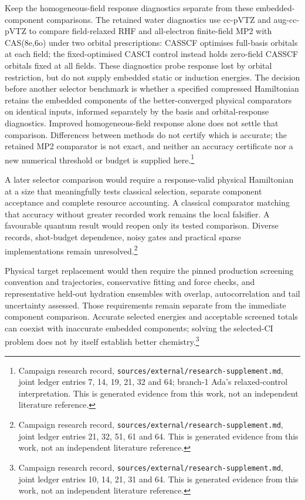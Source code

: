 \documentclass{article}
\newcommand{\record}[1]{\footnote{Campaign research record, \texttt{sources/external/research-supplement.md}, #1. This is generated evidence from this work, not an independent literature reference.}}
\begin{document}
Keep the homogeneous-field response diagnostics separate from these embedded-component comparisons. The retained water diagnostics use cc-pVTZ and aug-cc-pVTZ to compare field-relaxed RHF and all-electron finite-field MP2 with CAS(8e,6o) under two orbital prescriptions: CASSCF optimises full-basis orbitals at each field; the fixed-optimised CASCI control instead holds zero-field CASSCF orbitals fixed at all fields. These diagnostics probe response lost by orbital restriction, but do not supply embedded static or induction energies. The decision before another selector benchmark is whether a specified compressed Hamiltonian retains the embedded components of the better-converged physical comparators on identical inputs, informed separately by the basis and orbital-response diagnostics. Improved homogeneous-field response alone does not settle that comparison. Differences between methods do not certify which is accurate; the retained MP2 comparator is not exact, and neither an accuracy certificate nor a new numerical threshold or budget is supplied here.\record{joint ledger entries 7, 14, 19, 21, 32 and 64; branch-1 Ada's relaxed-control interpretation}

A later selector comparison would require a response-valid physical Hamiltonian at a size that meaningfully tests classical selection, separate component acceptance and complete resource accounting. A classical comparator matching that accuracy without greater recorded work remains the local falsifier. A favourable quantum result would reopen only its tested comparison. Diverse records, shot-budget dependence, noisy gates and practical sparse implementations remain unresolved.\record{joint ledger entries 21, 32, 51, 61 and 64}

Physical target replacement would then require the pinned production screening convention and trajectories, conservative fitting and force checks, and representative held-out hydration ensembles with overlap, autocorrelation and tail uncertainty assessed. Those requirements remain separate from the immediate component comparison. Accurate selected energies and acceptable screened totals can coexist with inaccurate embedded components; solving the selected-CI problem does not by itself establish better chemistry.\record{joint ledger entries 10, 14, 21, 31 and 64}



\end{document}
